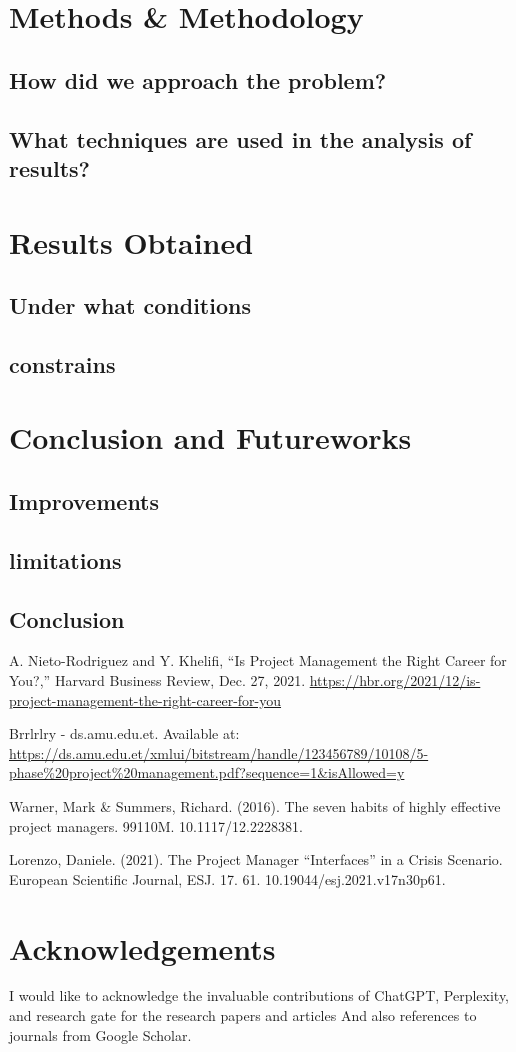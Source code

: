 \documentclass{article}
\begin{document}
\newpage
\section{Methods \& Methodology}
\subsection{How did we approach the problem?}
\subsection{What techniques are used in the analysis of results?}

\newpage
\section{Results Obtained}
\subsection{Under what conditions}
\subsection{constrains}

\newpage
\section{Conclusion and Futureworks}
\subsection{Improvements}
\subsection{limitations}
\subsection{Conclusion}



\newpage

\begin{thebibliography}{99}
A. Nieto-Rodriguez and Y. Khelifi, “Is Project Management the Right Career for You?,” Harvard Business Review, Dec. 27, 2021. \url{https://hbr.org/2021/12/is-project-management-the-right-career-for-you}

Brrlrlry - ds.amu.edu.et. Available at: 
\url{https://ds.amu.edu.et/xmlui/bitstream/handle/123456789/10108/5-phase%20project%20management.pdf?sequence=1&isAllowed=y}

Warner, Mark \& Summers, Richard. (2016). The seven habits of highly effective project managers. 99110M. 10.1117/12.2228381.

Lorenzo, Daniele. (2021). The Project Manager “Interfaces” in a Crisis Scenario. European Scientific Journal, ESJ. 17. 61. 10.19044/esj.2021.v17n30p61. 

\end{thebibliography}

\newpage

\section{Acknowledgements}
I would like to acknowledge the invaluable contributions of ChatGPT, Perplexity, and research gate for the research papers and articles And also references to journals from Google Scholar.
\end{document}
